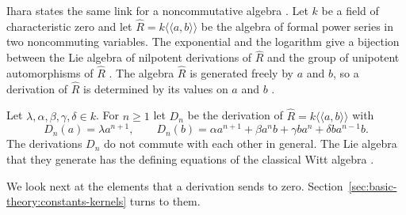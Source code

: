 Ihara states the same link for a noncommutative algebra
\cite[p.~192]{Ihara2012}. Let $k$ be a field of characteristic zero and let
$\hat R=k\langle\langle a,b\rangle\rangle$ be the algebra of formal power
series in two noncommuting variables. The exponential and the logarithm give a
bijection between the Lie algebra of nilpotent derivations of $\hat R$ and the
group of unipotent automorphisms of $\hat R$ \cite[p.~192]{Ihara2012}. The
algebra $\hat R$ is generated freely by $a$ and $b$, so a derivation of $\hat R$
is determined by its values on $a$ and $b$ \cite[p.~192]{Ihara2012}.

\begin{example}\label{ex:basic:ihara}
Let $\lambda,\alpha,\beta,\gamma,\delta\in k$. For $n\ge 1$ let $D_n$ be the
derivation of $\hat R=k\langle\langle a,b\rangle\rangle$ with
\[
D_n(a)=\lambda a^{n+1},\qquad
D_n(b)=\alpha a^{n+1}+\beta a^{n}b+\gamma ba^{n}+\delta ba^{n-1}b .
\]
The derivations $D_n$ do not commute with each other in general. The Lie algebra
that they generate has the defining equations of the classical Witt algebra
\cite[p.~192]{Ihara2012}.
\end{example}

We look next at the elements that a derivation sends to zero. Section~\ref{sec:basic-theory:constants-kernels} turns to them.
